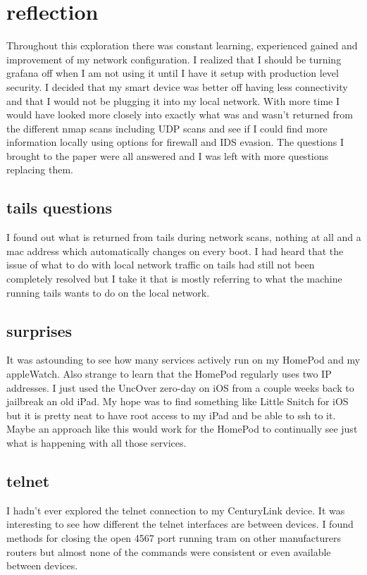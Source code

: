 \documentclass[10pt]{article}
\begin{document}
\section*{reflection}
Throughout this exploration there was constant learning, experienced gained and improvement of my network configuration. I realized that I should be turning 
grafana off when I am not using it until I have it setup with production level security. I decided that my smart device was better off 
having less connectivity and that I would not be plugging it into my local network. With more time I would have looked more closely into exactly
what was and wasn't returned from the different nmap scans including UDP scans and see if I could find more information locally using options for 
firewall and IDS evasion. The questions I brought to the paper were all answered and I was left with more questions replacing them.

\subsection*{tails questions}
I found out what is returned from tails during network scans, nothing at all and a mac address which automatically changes on every boot.
I had heard that the issue of what to do with local network traffic on tails had still not been completely resolved but I take it that is mostly
referring to what the machine running tails wants to do on the local network.

\subsection*{surprises}
It was astounding to see how many services actively run on my HomePod and my appleWatch. Also strange to learn that the HomePod regularly uses two
IP addresses. I just used the UncOver zero-day on iOS from a couple weeks back to jailbreak an old iPad. My hope was to find something like Little Snitch
for iOS but it is pretty neat to have root access to my iPad and be able to ssh to it. Maybe an approach like this would work for the HomePod to
continually see just what is happening with all those services.

\subsection*{telnet}
I hadn't ever explored the telnet connection to my CenturyLink device. It was interesting to see how different the telnet interfaces are between devices. 
I found methods for closing the open 4567 port running tram on other manufacturers routers but almost none of the commands were consistent or even available between devices.
\end{document}
